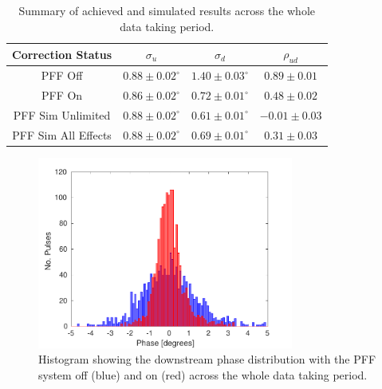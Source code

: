 

\begin{table}
  \begin{center}
    \begin{tabular}{| c c c c |}
	   \hline
       Correction Status & \(\sigma_u\) & \(\sigma_d\) & \(\rho_{ud}\) \\ \hline
       PFF Off & \(0.88\pm0.02^\circ\) & \(1.40\pm0.03^\circ\) & \(0.89\pm0.01\) \\
	   PFF On & \(0.86\pm0.02^\circ\) & \(0.72\pm0.01^\circ\) & \(0.48\pm0.02\) \\
	   PFF Sim Unlimited & \(0.88\pm0.02^\circ\) & \(0.61\pm0.01^\circ\) & \(-0.01\pm0.03\) \\
	   PFF Sim All Effects & \(0.88\pm0.02^\circ\) & \(0.69\pm0.01^\circ\) & \(0.31\pm0.03\) \\
    \hline
    \end{tabular}
    \caption{Summary of achieved and simulated results across the whole data taking period.}
  	\label{t:LongFF}
  \end{center}
\end{table}

\begin{figure}
  \centering
  \includegraphics[width=0.75\textwidth]{Figures/feedforward/longFF_histDownstreamPhase}
  \caption{Histogram showing the downstream phase distribution with the PFF system off (blue) and on (red) across the whole data taking period.}
  \label{f:longFF_histDownstreamPhase}
\end{figure}


